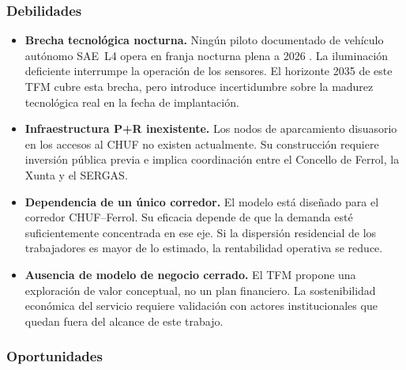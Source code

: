 \subsubsection{Debilidades}
\label{sec:dafo-debilidades}

\begin{itemize}

	\item \textbf{Brecha tecnológica nocturna.} Ningún piloto
	documentado de vehículo autónomo SAE~L4 opera en franja
	nocturna plena a 2026 \parencite{SHOW2024Legacy}. La iluminación
	deficiente interrumpe la operación de los sensores. El
	horizonte 2035 de este TFM cubre esta brecha, pero introduce
	incertidumbre sobre la madurez tecnológica real en la
	fecha de implantación.

	\item \textbf{Infraestructura P+R inexistente.} Los nodos
	de aparcamiento disuasorio en los accesos al CHUF no
	existen actualmente. Su construcción requiere inversión
	pública previa e implica coordinación entre el Concello
	de Ferrol, la Xunta y el SERGAS.

	\item \textbf{Dependencia de un único corredor.} El modelo
	está diseñado para el corredor CHUF--Ferrol. Su eficacia
	depende de que la demanda esté suficientemente concentrada
	en ese eje. Si la dispersión residencial de los trabajadores
	es mayor de lo estimado, la rentabilidad operativa se reduce.

	\item \textbf{Ausencia de modelo de negocio cerrado.}
	El TFM propone una exploración de valor conceptual, no un
	plan financiero. La sostenibilidad económica del servicio
	requiere validación con actores institucionales que
	quedan fuera del alcance de este trabajo.

\end{itemize}

\subsubsection{Oportunidades}
\label{sec:dafo-oportunidades}

